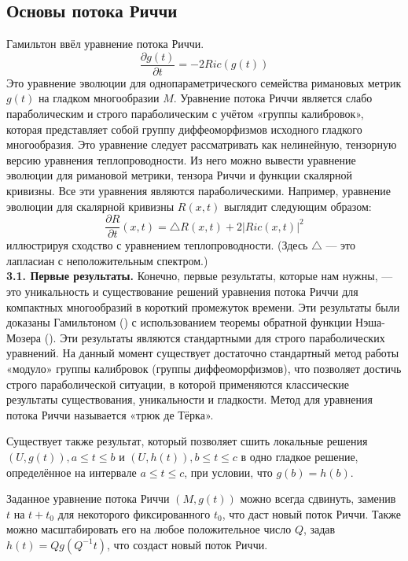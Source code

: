 \subsection{Основы потока Риччи}

Гамильтон \cite{c29} ввёл уравнение потока Риччи.
\[
\frac{\partial g(t)}{\partial t} = -2Ric(g(t))
\]
Это уравнение эволюции для однопараметрического семейства 
римановых метрик $g(t)$ на гладком многообразии $M$. 
Уравнение потока Риччи является слабо параболическим и 
строго параболическим с учётом «группы калибровок», 
которая представляет собой группу диффеоморфизмов 
исходного гладкого многообразия. 
Это уравнение следует рассматривать как нелинейную, 
тензорную версию уравнения теплопроводности. 
Из него можно вывести уравнение эволюции для римановой метрики, 
тензора Риччи и функции скалярной кривизны. 
Все эти уравнения являются параболическими. 
Например, уравнение эволюции для скалярной кривизны 
$R(x,t)$ выглядит следующим образом:
\begin{equation}
    \frac{\partial R}{\partial t}(x,t) = \bigtriangleup R(x,t)+2{| Ric(x,t)|}^2
    \label{eqn0.1}
\end{equation}
иллюстрируя сходство с уравнением теплопроводности. 
(Здесь $\bigtriangleup$ — это лапласиан с неположительным спектром.)\\

\textbf{3.1. Первые результаты.} Конечно, первые результаты, которые нам нужны, 
— это уникальность и существование решений уравнения потока Риччи для 
компактных многообразий в короткий промежуток времени. Эти результаты 
были доказаны Гамильтоном (\cite{c29}) с использованием теоремы обратной функции 
Нэша-Мозера (\cite{c28}). Эти результаты являются стандартными для строго 
параболических уравнений. На данный момент существует достаточно стандартный 
метод работы «модуло» группы калибровок (группы диффеоморфизмов), что 
позволяет достичь строго параболической ситуации, в которой применяются 
классические результаты существования, уникальности и гладкости. Метод для 
уравнения потока Риччи называется «трюк де Тёрка».

Существует также результат, который позволяет сшить локальные решения 
$(U,g(t)),a\leq t\leq b$ и $(U,h(t)),b\leq t\leq c$ в одно гладкое решение, 
определённое на интервале $a\leq t\leq c$, при условии, что 
$g(b)=h(b)$.

Заданное уравнение потока Риччи $(M,g(t))$ можно всегда сдвинуть, 
заменив $t$ на $t+t_0$ для некоторого фиксированного $t_0$, что даст 
новый поток Риччи. Также можно масштабировать его на любое 
положительное число $Q$, задав $h(t)=Q g(Q^{-1} t)$, 
что создаст новый поток Риччи.